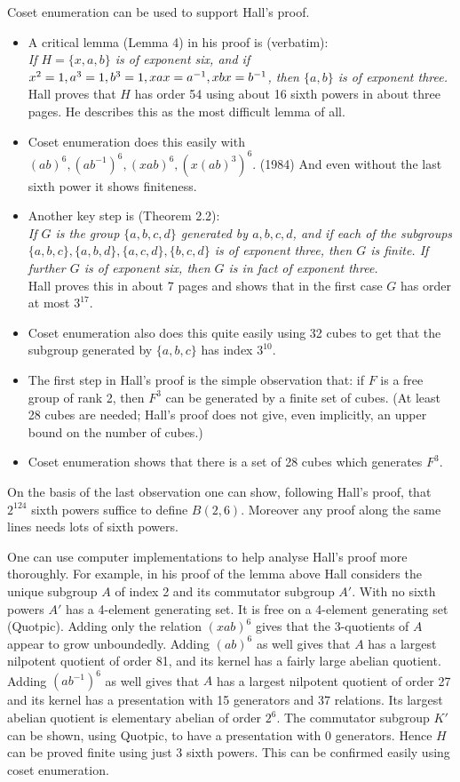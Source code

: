 \documentclass[12pt]{article}
\begin{document}
Coset enumeration can be used to support Hall's proof.

\begin{itemize}
\item
A critical lemma (Lemma 4) in his proof is (verbatim): \\
{\em If $H = \{x,a,b\}$ is of exponent six, and if $x^2 = 1,
a^3 = 1, b^3 = 1, \\ xax = a^{-1}, xbx = b^{-1}$, then $\{a,b\}$ is
of exponent three.} \\
Hall proves that $H$ has order 54 using about 16 sixth powers in about
three pages. He describes this as the most difficult lemma of all.
\item
Coset enumeration does this easily with $(ab)^6,(ab^{-1})^6,(xab)^6,
(x(ab)^3)^6$. (1984) And even without the last sixth power it shows 
finiteness.
\item 
Another key step is (Theorem 2.2): \\
{\em If $G$ is the group $\{a,b,c,d\}$ generated by $a,b,c,d$, and if
each of the subgroups $\{a,b,c\}, \{a,b,d\}, \{a,c,d\}, \{b,c,d\}$ is
of exponent three, then $G$ is finite. If further $G$ is of exponent
six, then $G$ is in fact of exponent three.} \\
Hall proves this in about 7 pages and shows that in the first case
$G$ has order at most $3^{17}$.
\item
Coset enumeration also does this quite easily using 32 cubes to get
that the subgroup generated by $\{a,b,c\}$ has index $3^{10}$. 
\item
The first step in Hall's proof is the simple observation that:
if $F$ is a free group of rank 2, then $F^3$ can be generated by
a finite set of cubes. (At least 28 cubes are needed; Hall's
proof does not give, even implicitly, an upper bound on the
number of cubes.)
\item
Coset enumeration shows that there is a set of 28 cubes which
generates $F^3$.
\end{itemize}

On the basis of the last observation one can show, following Hall's
proof, that $2^{124}$ sixth powers suffice to define $B(2,6)$.
Moreover any proof along the same lines needs lots of sixth powers.

One can use computer implementations to help analyse Hall's proof 
more thoroughly.
For example, in his proof of the lemma above Hall considers the unique subgroup
$A$ of index 2 and its commutator subgroup $A'$. With no sixth powers
$A'$ has a 4-element generating set. It is free on a 4-element generating
set (Quotpic). 
Adding only the relation $(xab)^6$ gives that 
the 3-quotients of $A$ appear to grow unboundedly.
Adding $(ab)^6$ as well gives that $A$ has a
largest nilpotent quotient of order 81, and its kernel has a fairly
large abelian quotient.
Adding $(ab^{-1})^6$ as well gives that $A$ has a largest nilpotent
quotient of order 27 and its kernel has a presentation with 15
generators and 37 relations.
Its largest
abelian quotient is elementary abelian of order $2^6$. 
The commutator subgroup $K'$ can be shown, using Quotpic, to have
a presentation with 0 generators.
Hence $H$ can be proved finite using just 3 sixth powers.
This can be confirmed easily using coset enumeration.
\end{document}
